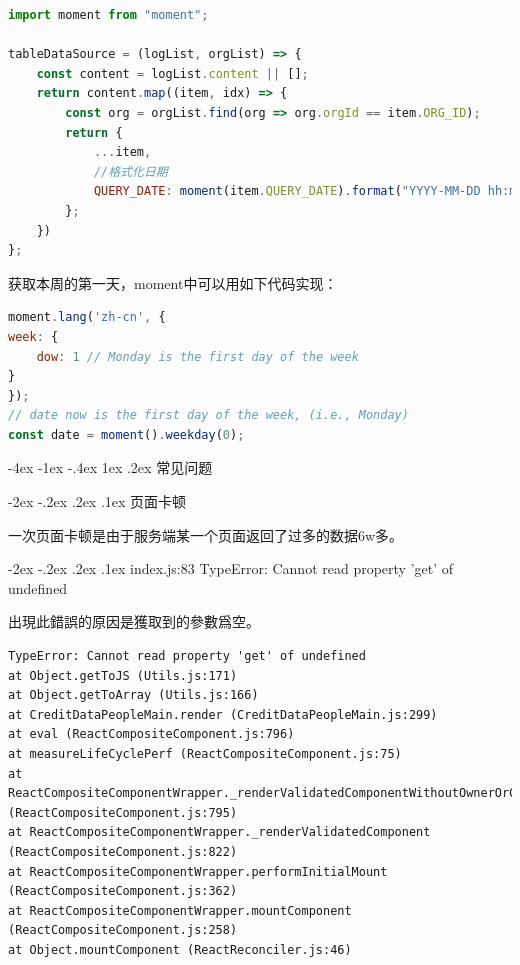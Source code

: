 \documentclass[12pt]{book}
\makeatletter
\numberwithin{dummy}{section}
\theoremstyle{ocrenumbox}
\theoremstyle{blacknumex}
\theoremstyle{blacknumbox}
\theoremstyle{ocrenum}
\renewcommand{\section}{\@startsection{section}{1}{\z@}
	{-4ex \@plus -1ex \@minus -.4ex}
	{1ex \@plus.2ex }
	{\normalfont\large\sffamily\bfseries}}
\renewcommand\paragraph{\@startsection{paragraph}{4}{\z@}
	{-2ex \@plus-.2ex \@minus .2ex}
	{.1ex}
	{\normalfont\small\sffamily\bfseries}}
\makeatother
\begin{document}
\begin{lstlisting}[language=Javascript]
import moment from "moment";

tableDataSource = (logList, orgList) => {
	const content = logList.content || [];
	return content.map((item, idx) => {
		const org = orgList.find(org => org.orgId == item.ORG_ID);
		return {
			...item,
			//格式化日期
			QUERY_DATE: moment(item.QUERY_DATE).format("YYYY-MM-DD hh:mm:ss"),
		};
	})
};
\end{lstlisting}

获取本周的第一天，moment中可以用如下代码实现：

\begin{lstlisting}[language=Javascript]
moment.lang('zh-cn', {
week: {
	dow: 1 // Monday is the first day of the week
}
});
// date now is the first day of the week, (i.e., Monday)
const date = moment().weekday(0); 
\end{lstlisting}

\section{常见问题}

\paragraph{页面卡顿}

一次页面卡顿是由于服务端某一个页面返回了过多的数据6w多。

\paragraph{index.js:83 TypeError: Cannot read property 'get' of undefined}

出現此錯誤的原因是獲取到的參數爲空。

\begin{lstlisting}
TypeError: Cannot read property 'get' of undefined
at Object.getToJS (Utils.js:171)
at Object.getToArray (Utils.js:166)
at CreditDataPeopleMain.render (CreditDataPeopleMain.js:299)
at eval (ReactCompositeComponent.js:796)
at measureLifeCyclePerf (ReactCompositeComponent.js:75)
at ReactCompositeComponentWrapper._renderValidatedComponentWithoutOwnerOrContext (ReactCompositeComponent.js:795)
at ReactCompositeComponentWrapper._renderValidatedComponent (ReactCompositeComponent.js:822)
at ReactCompositeComponentWrapper.performInitialMount (ReactCompositeComponent.js:362)
at ReactCompositeComponentWrapper.mountComponent (ReactCompositeComponent.js:258)
at Object.mountComponent (ReactReconciler.js:46)
\end{lstlisting}
\end{document}
